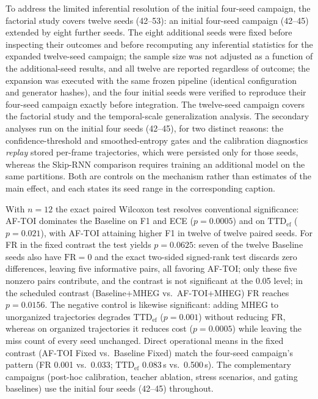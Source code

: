 \documentclass[a4paper,fleqn]{cas-dc}
\begin{document}
{\color{\revcolor}To address the limited inferential resolution of the
initial four-seed campaign, the factorial study covers twelve seeds (42--53): an initial four-seed
campaign (42--45) extended by eight further seeds.
The eight additional seeds were fixed before inspecting their outcomes and
before recomputing any inferential statistics for the expanded twelve-seed
campaign; the sample size was not adjusted as a function of the
additional-seed results, and all twelve are reported regardless of outcome; the expansion
was executed with the same frozen pipeline (identical configuration and
generator hashes), and the four initial seeds were verified to reproduce
their four-seed campaign exactly before integration.
{\color{\revcolor}The twelve-seed campaign covers the factorial study and the
temporal-scale generalization analysis. The secondary analyses run on the
initial four seeds (42--45), for two distinct reasons: the confidence-threshold
and smoothed-entropy gates and the calibration diagnostics \emph{replay} stored
per-frame trajectories, which were persisted only for those seeds, whereas the
Skip-RNN comparison requires training an additional model on the same
partitions. Both are controls on the mechanism rather than estimates of the
main effect, and each states its seed range in the corresponding caption.}

With $n=12$ the exact
paired Wilcoxon test resolves conventional significance:
\mbox{AF-TOI} dominates the Baseline on F1 and ECE ($p=0.0005$) and on
$\mathrm{TTD}_{\mathrm{ef}}$ ($p=0.021$), with \mbox{AF-TOI} attaining higher
F1 in twelve of twelve paired seeds. For FR in the fixed contrast the test
yields $p=0.0625$: seven of the twelve Baseline seeds also have $\mathrm{FR}=0$
and the exact two-sided signed-rank test discards zero differences, leaving
five informative pairs, all favoring \mbox{AF-TOI}; only these five nonzero
pairs contribute, and the contrast is not significant at the 0.05 level; in the scheduled contrast (Baseline+MHEG vs.\
\mbox{AF-TOI}+MHEG) FR reaches $p=0.0156$. The negative control is likewise
significant: adding \mbox{MHEG} to unorganized trajectories degrades
$\mathrm{TTD}_{\mathrm{ef}}$ ($p=0.001$) without reducing FR, whereas on
organized trajectories it reduces cost ($p=0.0005$) while leaving the miss
count of every seed unchanged. Direct operational means in the fixed contrast
(\mbox{AF-TOI} Fixed vs.\ Baseline Fixed) match the four-seed campaign's
pattern (FR 0.001 vs.\ 0.033; $\mathrm{TTD}_{\mathrm{ef}}$ 0.083\,s vs.\
0.500\,s). The complementary campaigns (post-hoc calibration, teacher
ablation, stress scenarios, and gating baselines) use the initial four
seeds (42--45) throughout.}
\end{document}
